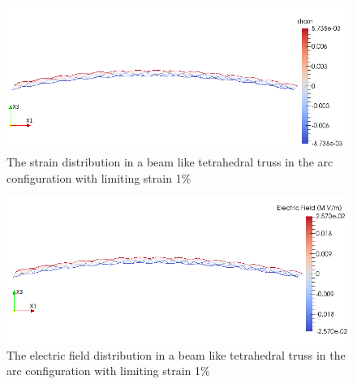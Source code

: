 \begin{figure}  
\centering
\includegraphics[width=5.0in]{./chap_5_active_trusses/images_non_linear_time_dependent_constitutive_equatio/limiting_strain_linear_tetrahedral_bending_strain_contour.png}
\caption{The strain distribution in a beam like tetrahedral truss in the arc configuration with limiting strain 1\%}
\label{fig:limiting_strain_linear_tetrahedral_bending_strain_contour}
\end{figure} 

\begin{figure}  
\centering
\includegraphics[width=5.0in]{./chap_5_active_trusses/images_non_linear_time_dependent_constitutive_equatio/limiting_strain_linear_tetrahedral_bending_electric_field_contour.png}
\caption{The electric field distribution in a beam like tetrahedral truss in the arc configuration with limiting strain 1\%}
\label{fig:limiting_strain_linear_tetrahedral_bending_electric_field_contour} 
\end{figure} 

